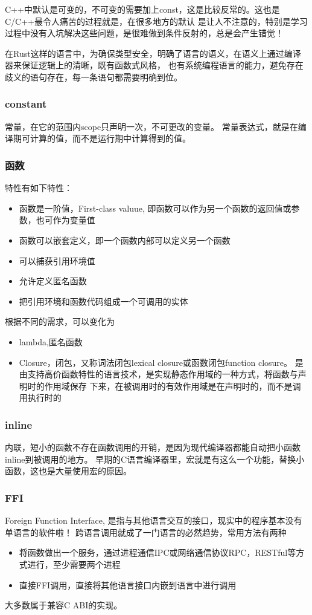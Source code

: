 C++中默认是可变的，不可变的需要加上const，这是比较反常的。这也是C/C++最令人痛苦的过程就是，在很多地方的默认
是让人不注意的，特别是学习过程中没有入坑解决这些问题，是很难做到条件反射的，总是会产生错觉！

在Rust这样的语言中，为确保类型安全，明确了语言的语义，在语义上通过编译器来保证逻辑上的清晰，既有函数式风格，
也有系统编程语言的能力，避免存在歧义的语句存在，每一条语句都需要明确到位。

\subsubsection{constant}
常量，在它的范围内scope只声明一次，不可更改的变量。
常量表达式，就是在编译期可计算的值，而不是运行期中计算得到的值。

\subsubsection{函数}
特性有如下特性：
\begin{itemize}
    \item {函数是一阶值，First-class valuue, 即函数可以作为另一个函数的返回值或参数，也可作为变量值}
    \item {函数可以嵌套定义，即一个函数内部可以定义另一个函数}
    \item {可以捕获引用环境值}
    \item {允许定义匿名函数}
    \item {把引用环境和函数代码组成一个可调用的实体}
\end{itemize}
根据不同的需求，可以变化为
\begin{itemize}
    \item {lambda,匿名函数}
    \item {Closure，闭包，又称词法闭包lexical closure或函数闭包function closure。
    是由支持高价函数特性的语言技术，是实现静态作用域的一种方式，将函数与声明时的作用域保存
    下来，在被调用时的有效作用域是在声明时的，而不是调用执行时的}
\end{itemize}

\subsubsection{inline}
内联，短小的函数不存在函数调用的开销，是因为现代编译器都能自动把小函数inline到被调用的地方。
早期的C语言编译器里，宏就是有这么一个功能，替换小函数，这也是大量使用宏的原因。

\subsubsection{FFI}
Foreign Function Interface, 是指与其他语言交互的接口，现实中的程序基本没有单语言的软件啦！
跨语言调用就成了一门语言的必然趋势，常用方法有两种
\begin{itemize}
    \item {将函数做出一个服务，通过进程通信IPC或网络通信协议RPC，RESTful等方式进行，至少需要两个进程}
    \item {直接FFI调用，直接将其他语言接口内嵌到语言中进行调用}
\end{itemize}
大多数属于兼容C ABI的实现。

